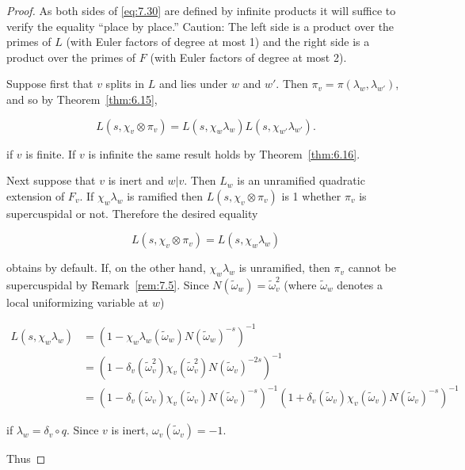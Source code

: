\begin{proof}

As both sides of \eqref{eq:7.30} are defined by infinite products it will suffice to verify the equality ``place by place.'' Caution: The left side is a product over the primes of $L$ (with Euler factors of degree at most 1) and the right side is a product over the primes of $F$ (with Euler factors of degree at most 2).

Suppose first that $v$ splits in $L$ and lies under $w$ and $w'$. Then $\pi_v = \pi(\lambda_w, \lambda_{w'})$, and so by Theorem~\ref{thm:6.15},

\begin{equation}\label{eq:7.31}
L(s,\chi_v \otimes \pi_v) = L(s,\chi_w\lambda_w)L(s,\chi_{w'}\lambda_{w'}).\tag{7.31}
\end{equation}

if $v$ is finite. If $v$ is infinite the same result holds by Theorem~\ref{thm:6.16}.

Next suppose that $v$ is inert and $w|v$. Then $L_w$ is an unramified quadratic extension of $F_v$. If $\chi_w\lambda_w$ is ramified then $L(s,\chi_v \otimes \pi_v)$ is 1 whether $\pi_v$ is supercuspidal or not. Therefore the desired equality

\begin{equation}\label{eq:7.32}
L(s,\chi_v \otimes \pi_v) = L(s,\chi_w\lambda_w)\tag{7.32}
\end{equation}

obtains by default. If, on the other hand, $\chi_w\lambda_w$ is unramified, then $\pi_v$ cannot be supercuspidal by Remark~\ref{rem:7.5}. Since $N(\tilde{\omega}_w) = \tilde{\omega}_v^{2}$ (where $\tilde{\omega}_w$ denotes a local uniformizing variable at $w$)

\[
\begin{aligned}
L(s,\chi_w\lambda_w) &= (1 - \chi_w\lambda_w(\tilde{\omega}_w)N(\tilde{\omega}_w)^{-s})^{-1}\\
&= (1 - \delta_v(\tilde{\omega}_v^{2})\chi_v(\tilde{\omega}_v^{2})N(\tilde{\omega}_v)^{-2s})^{-1}\\
&= (1 - \delta_v(\tilde{\omega}_v)\chi_v(\tilde{\omega}_v)N(\tilde{\omega}_v)^{-s})^{-1}(1 + \delta_v(\tilde{\omega}_v)\chi_v(\tilde{\omega}_v)N(\tilde{\omega}_v)^{-s})^{-1}
\end{aligned}
\]

if $\lambda_w = \delta_v \circ q$. Since $v$ is inert, $\omega_v(\tilde{\omega}_v) = -1$.

Thus


\end{proof}
